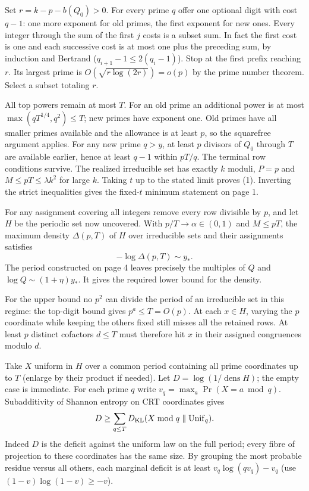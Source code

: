 \documentclass[11pt]{article}
\newcommand{\head}[1]{\par\vspace{5pt}{\large\bfseries #1}\par}
\begin{document}
\newpage
\head{Reaching every size and retaining the cap}
Set $r=k-p-b(Q_0)>0$. For every prime $q$ offer one optional digit with cost $q-1$: one more exponent for old primes, the first exponent for new ones. Every integer through the sum of the first $j$ costs is a subset sum. In fact the first cost is one and each successive cost is at most one plus the preceding sum, by induction and Bertrand ($q_{i+1}-1\le2(q_i-1)$). Stop at the first prefix reaching $r$. Its largest prime is $O(\sqrt{r\log(2r)})=o(p)$ by the prime number theorem. Select a subset totaling $r$.

All top powers remain at most $T$. For an old prime an additional power is at most $\max(qT^{1/4},q^2)\le T$; new primes have exponent one. Old primes have all smaller primes available and the allowance is at least $p$, so the squarefree argument applies. For any new prime $q>y$, at least $p$ divisors of $Q_0$ through $T$ are available earlier, hence at least $q-1$ within $pT/q$. The terminal row conditions survive. The realized irreducible set has exactly $k$ moduli, $P=p$ and $M\le pT\le\lambda k^2$ for large $k$. Taking $t$ up to the stated limit proves (1). Inverting the strict inequalities gives the fixed-$t$ minimum statement on page 1.

\head{4. A sharp estimate for loss of coverage}
For any assignment covering all integers remove every row divisible by $p$, and let $H$ be the periodic set now uncovered. With $p/T\to\alpha\in(0,1)$ and $M\le pT$, the maximum density $\Delta(p,T)$ of $H$ over irreducible sets and their assignments satisfies
\[
                       -\log \Delta(p,T)\sim y_* .\tag{4}
\]
The period constructed on page 4 leaves precisely the multiples of $Q$ and $\log Q\sim(1+\eta)y_*$. It gives the required lower bound for the density.

For the upper bound no $p^2$ can divide the period of an irreducible set in this regime: the top-digit bound gives $p^a\le T=O(p)$. At each $x\in H$, varying the $p$ coordinate while keeping the others fixed still misses all the retained rows. At least $p$ distinct cofactors $d\le T$ must therefore hit $x$ in their assigned congruences modulo $d$.

Take $X$ uniform in $H$ over a common period containing all prime coordinates up to $T$ (enlarge by their product if needed). Let $D=\log(1/\operatorname{dens}H)$; the empty case is immediate. For each prime $q$ write $v_q=\max_a\Pr(X=a\bmod q)$. Subadditivity of Shannon entropy on CRT coordinates gives
\[
 D\ge\sum_{q\le T}D_{\rm KL}(X\bmod q\;\|\;\mathrm{Unif}_q).
\]
Indeed $D$ is the deficit against the uniform law on the full period; every fibre of projection to these coordinates has the same size. By grouping the most probable residue versus all others, each marginal deficit is at least $v_q\log(qv_q)-v_q$ (use $(1-v)\log(1-v)\ge-v$).
\end{document}
